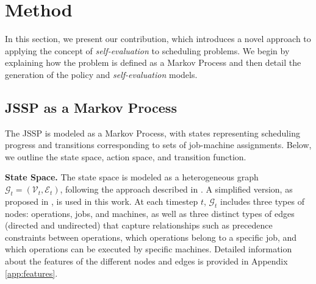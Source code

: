 \section{Method}
\label{sec:method}

In this section, we present our contribution, which introduces a novel approach to applying the concept of \emph{self-evaluation} to scheduling problems. We begin by explaining how the problem is defined as a Markov Process and then detail the generation of the policy and \emph{self-evaluation} models. 




\subsection{JSSP as a Markov Process}

The JSSP is modeled as a Markov Process, with states representing scheduling progress and transitions corresponding to sets of job-machine assignments. Below, we outline the state space, action space, and transition function.

\textbf{State Space.} The state space is modeled as a heterogeneous graph $\mathcal{G}_t = (\mathcal{V}_t, \mathcal{E}_t)$, following the approach described in \cite{song2022flexible}. A simplified version, as proposed in \cite{echeverria2024multi}, is used in this work. At each timestep $t$, $\mathcal{G}_t$ includes three types of nodes: operations, jobs, and machines, as well as three distinct types of edges (directed and undirected) that capture relationships such as precedence constraints between operations, which operations belong to a specific job, and which operations can be executed by specific machines. Detailed information about the features of the different nodes and edges is provided in Appendix \ref{app:features}.

